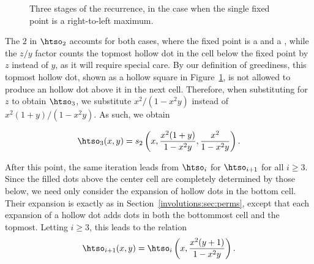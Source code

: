\documentclass[12pt,twoside]{memoir}
\begin{document}
\begin{figure}[t]
      \caption{Three stages of the recurrence, in the case when the single
              fixed point is a right-to-left maximum.}
      \label{involutions:fig:3stages}
      \end{figure}


      The $2$ in $\htso_2$ accounts for both cases, where the fixed point is a
      \rtlmax{} and a \ltrmin{}, while the $z/y$ factor counts the topmost
      hollow dot in the cell below the fixed point by $z$ instead of $y$, as it
      will require special care. By our definition of greediness, this topmost
      hollow dot, shown as a hollow square in
      Figure~\ref{involutions:fig:3stages}, is not allowed to produce an
      hollow dot above it in the next cell. Therefore, when substituting for $z$ to
      obtain $\htso_3$, we substitute $x^2/(1-x^2y)$ instead of
      $x^2(1+y)/(1-x^2y)$. As such, we obtain


      $$ \htso_3(x,y)
          =s_2\left(x, \frac{x^2(1+y)}{1-x^2y}, \frac{x^2}{1-x^2y}\right). $$

      After this point, the same iteration leads from $\htso_i$ for $\htso_{i+1}$
      for all $i \geq 3$. Since the filled dots above the center cell are
      completely determined by those below, we need only consider the expansion
      of hollow dots in the bottom cell. Their expansion is exactly as in
      Section~\ref{involutions:sec:perms}, except that each expansion of a hollow
      dot adds dots in both the bottommost cell and the topmost. Letting $i \geq
      3$, this leads to the relation
      \begin{equation}\label{involutions:eqn:iteration-inv}
        \htso_{i+1}(x,y) = \htso_i \left(x, \frac{x^2(y+1)}{1-x^2y} \right).
      \end{equation}
\end{document}
